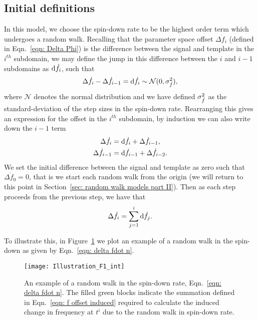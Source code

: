 \documentclass[../full_thesis/full_thesis.tex]{subfiles}
\begin{document}
\subsection{Initial definitions} In this model, we choose the spin-down rate to
be the highest order term which undergoes a random walk. Recalling that the
parameter space offset $\Delta \dot{f}_i$ (defined in Eqn.~\eqref{eqn: Delta
Phi}) is the difference between the signal and template in the $i^{th}$
subdomain, we may define the jump in this difference between the $i$ and $i-1$
subdomains as $\mathrm{d} \dot{f}_i$, such that
\begin{equation}
\Delta \dot{f}_{i} - \Delta\dot{f}_{i-1} = \mathrm{d} \dot{f}_{i} \sim \mathcal{N}(0, \sigma_{\dot{f}}^{2}),
\label{eqn: fdot N}
\end{equation}
where $\mathcal{N}$ denotes the normal distribution and we have defined $\sigma_{\dot{f}}^{2}$
as the standard-deviation of the step sizes in the spin-down rate. Rearranging
this gives an expression for the offset in the
$i^{th}$ subdomain, by induction we can also write down the $i-1$ term
\begin{align}
\Delta\dot{f}_{i} &  = \mathrm{d}\dot{f}_{i} + \Delta\dot{f}_{i-1},  \\
\Delta\dot{f}_{i-1} &  = \mathrm{d}\dot{f}_{i-1} + \Delta\dot{f}_{i-2}  .
\end{align}
We set the initial difference between the signal and template as zero such
that $\Delta\dot{f}_0=0$, that is we start each random walk from the origin
(we will return to this point in Section~\ref{sec: random walk models part
II}). Then as each step proceeds from the previous step, we have that
\begin{equation}
\Delta\dot{f}_{i} = \sum_{j=1}^{i}\mathrm{d}\dot{f}_{j}.
\label{eqn: delta fdot n}
\end{equation}

To illustrate this, in Figure~\ref{fig: Illustration fdot int} we plot an example
of a random walk in the spin-down as given by Eqn.~\eqref{eqn: delta fdot n}.
\begin{figure}[ht]
\centering
\texttt{[image: Illustration\_F1\_int]}
\caption{An example of a random walk in the spin-down rate,
Eqn.~\eqref{eqn: delta fdot n}. The filled green blocks indicate the
summation defined in Eqn.~\eqref{eqn: f offset induced} required to
calculate the induced change in frequency at $t^{i}$ due to the random walk in
spin-down rate.}
\label{fig: Illustration fdot int}
\end{figure}
\end{document}
